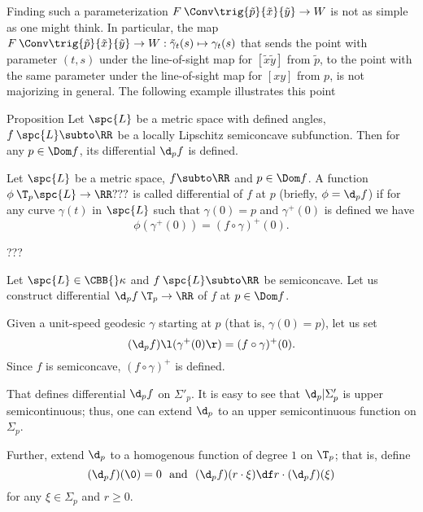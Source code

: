 Finding such a parameterization $F\:\Conv\trig{\tilde p}{\tilde x}{\tilde y}\to W$ is not as simple as one might think. 
In particular, the map $F\:\Conv\trig{\tilde p}{\tilde x}{\tilde y}\to W:\tilde \gamma_t(s)\mapsto \gamma_t(s)$ that sends the point with parameter $(t,s)$ under the line-of-sight map for $[\tilde x\tilde y]$ from $\tilde p$, to the point with the same parameter  under the line-of-sight map for $[x y]$ from  $p$,  is not majorizing in general.  The following example illustrates this point









\begin{thm}{Proposition}
Let $\spc{L}$ be a metric space with defined angles, 
$f\:\spc{L}\subto \RR$ be a locally Lipschitz semiconcave subfunction.
Then for any $p\in\Dom f$, its differential $\d_p f$ is defined.
\end{thm}


Let $\spc{L}$ be a metric space, 
$f\subto \RR$
and $p\in\Dom f$.
A function $\phi\:\T_p\spc{L}\to\RR???$ is called differential of $f$ at $p$ (briefly, $\phi=\d_p f$)
if for any curve $\gamma(t)$ in $\spc{L}$ such that $\gamma(0)=p$ and $\gamma^+(0)$ is defined we have
\[\phi(\gamma^+(0))=(f\circ\gamma)^+(0).\]

???

Let $\spc{L}\in\CBB{}\kappa$ and $f\:\spc{L}\subto\RR$ be semiconcave. 
Let us construct differential $\d_p f\:\T_p\to \RR$ of $f$ at $p\in\Dom f$.

Given a unit-speed geodesic $\gamma$ starting at $p$ (that is, $\gamma(0)=p$), let us set
\[(\d_p f)\l(\gamma^+(0)\r)
=(f\circ{\gamma})^+(0).\]
Since $f$ is semiconcave, $(f\circ{\gamma})^+$ is defined. 

That defines differential $\d_p f$ on $\Sigma'_p$.
It is easy to see that $\d_p|\Sigma'_p$ is upper semicontinuous;
thus, one can extend $\d_p$ to an upper semicontinuous function on $\Sigma_p$.

Further, extend $\d_p$ to a homogenous function of degree $1$ on $\T_p$; that is, define 
\[(\d_p f)(\0)=0
\ \ \hbox{and}\ \ 
(\d_p f)(r\cdot\xi)
\df
r\cdot (\d_p f)(\xi)\] 
for any $\xi\in\Sigma_p$ and $r\ge 0$.












